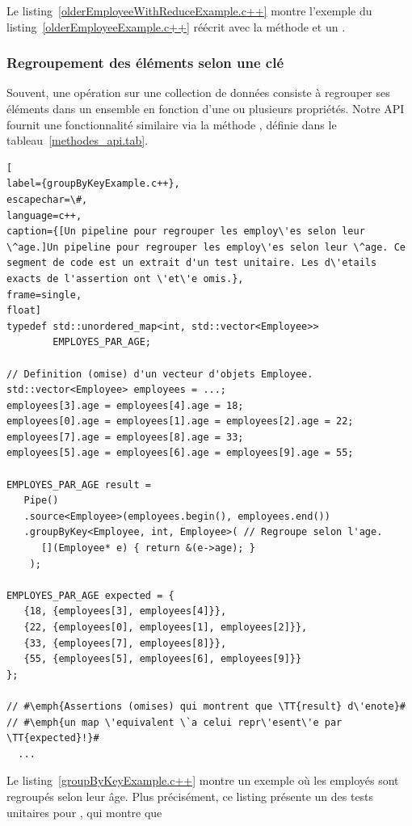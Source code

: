 Le listing~\ref{olderEmployeeWithReduceExample.c++} montre l'exemple du listing~\ref{olderEmployeeExample.c++} r\'e\'ecrit avec la m\'ethode  et un .


\subsubsection{Regroupement des \'el\'ements selon une cl\'e}

Souvent, une op\'eration sur une collection de donn\'ees consiste \`a regrouper ses \'el\'ements dans un ensemble en fonction d'une ou plusieurs propri\'et\'es. Notre {API} fournit une fonctionnalit\'e similaire via la m\'ethode , d\'efinie dans le tableau~\ref{methodes_api.tab}. 


\begin{lstlisting}[
label={groupByKeyExample.c++},
escapechar=\#,
language=c++,
caption={[Un pipeline pour regrouper les employ\'es selon leur \^age.]Un pipeline pour regrouper les employ\'es selon leur \^age. Ce segment de code est un extrait d'un test unitaire. Les d\'etails exacts de l'assertion ont \'et\'e omis.},
frame=single,
float]
typedef std::unordered_map<int, std::vector<Employee>> 
        EMPLOYES_PAR_AGE;

// Definition (omise) d'un vecteur d'objets Employee.
std::vector<Employee> employees = ...; 
employees[3].age = employees[4].age = 18;
employees[0].age = employees[1].age = employees[2].age = 22;
employees[7].age = employees[8].age = 33;
employees[5].age = employees[6].age = employees[9].age = 55;

EMPLOYES_PAR_AGE result = 
   Pipe()
   .source<Employee>(employees.begin(), employees.end())
   .groupByKey<Employee, int, Employee>( // Regroupe selon l'age.
      [](Employee* e) { return &(e->age); } 
    );
    
EMPLOYES_PAR_AGE expected = {
   {18, {employees[3], employees[4]}},
   {22, {employees[0], employees[1], employees[2]}},
   {33, {employees[7], employees[8]}},
   {55, {employees[5], employees[6], employees[9]}}
};

// #\emph{Assertions (omises) qui montrent que \TT{result} d\'enote}#
// #\emph{un map \'equivalent \`a celui repr\'esent\'e par \TT{expected}!}#
  ...
\end{lstlisting}




Le listing~\ref{groupByKeyExample.c++} montre un exemple o\`u les employ\'es sont regroup\'es selon leur \^age. Plus pr\'ecis\'ement, ce listing pr\'esente un des tests unitaires pour , qui montre que%
%



